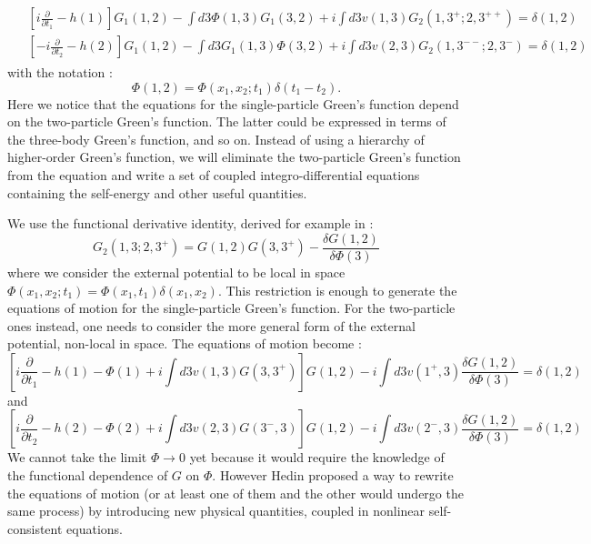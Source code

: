 \begin{align}
\begin{split}
	&\left[ i\frac{\partial}{\partial t_1} - h(1) \right] G_1(1,2) - \int d3 \Phi(1,3)G_1(3,2) + i \int d3 v(1,3) G_2(1,3^+;2,3^{++}) = \delta(1,2) \\
	&\left[ -i\frac{\partial}{\partial t_2} - h(2) \right] G_1(1,2) - \int d3 G_1(1,3)\Phi(3,2) + i \int d3 v(2,3) G_2(1,3^{--};2,3^-) = \delta(1,2)
\end{split}
\end{align}
with the notation : 
\begin{equation}
	\Phi(1,2) = \Phi(x_1,x_2;t_1) \delta(t_1-t_2).
\end{equation}
Here we notice that the equations for the single-particle Green's function depend on the two-particle Green's function. The latter could be expressed in terms of the three-body Green's function, and so on. Instead of using a hierarchy of higher-order Green's function, we will eliminate the two-particle Green's function from the equation and write a set of coupled integro-differential equations containing the self-energy and other useful quantities.
%

We use the functional derivative identity, derived for example in \cite{strinati1988application} :
\begin{equation}
	G_2(1,3;2,3^+) = G(1,2)G(3,3^+) - \frac{\delta G(1,2)}{\delta \Phi(3)} \label{eq:2GF_dPhi}
\end{equation}
where we consider the external potential to be local in space $\Phi(x_1,x_2;t_1) = \Phi(x_1,t_1)\delta(x_1,x_2)$. This restriction is enough to generate the equations of motion for the single-particle Green's function. For the two-particle ones instead, one needs to consider the more general form of the external potential, non-local in space.
The equations of motion become :
\begin{equation}
	\left[ i \frac{\partial}{\partial t_1} - h(1) - \Phi(1) + i \int d3 v(1,3)G(3,3^+) \right] G(1,2) - i \int d3 v(1^+,3) \frac{\delta G(1,2)}{\delta \Phi(3)} = \delta(1,2)
\end{equation}
and
\begin{equation}
	\left[ i \frac{\partial}{\partial t_2} - h(2) - \Phi(2) + i \int d3 v(2,3)G(3^-,3) \right] G(1,2) - i \int d3 v(2^-,3) \frac{\delta G(1,2)}{\delta \Phi(3)} = \delta(1,2)
\end{equation}
We cannot take the limit $\Phi \to 0$ yet because it would require the knowledge of the functional dependence of $G$ on $\Phi$. However Hedin proposed a way to rewrite the equations of motion (or at least one of them and the other would undergo the same process) by introducing new physical quantities, coupled in nonlinear self-consistent equations.\cite{hedin1965new} 
%

